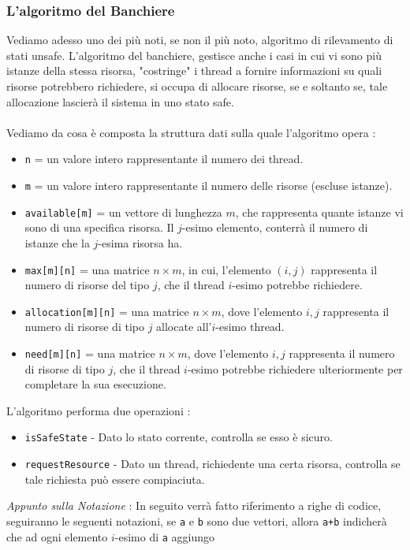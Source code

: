 \documentclass[12pt, letterpaper]{article}
\newcommand{\code}[1]{\colorbox{light-gray}{\texttt{#1}}}
\newcommand{\acc}{\\\hphantom{}\\}
\begin{document}
\subsubsection{L'algoritmo del Banchiere}\label{banchiere}
Vediamo adesso uno dei più noti, se non il più noto, algoritmo di rilevamento di stati unsafe. L'algoritmo del banchiere, 
gestisce anche i casi in cui vi sono più istanze della stessa risorsa, "costringe" i thread a fornire informazioni 
su quali risorse potrebbero richiedere, si occupa di allocare risorse, se e soltanto se, tale allocazione 
lascierà il sistema in uno stato safe.\acc 
Vediamo da cosa è composta la struttura dati sulla quale l'algoritmo opera : \begin{itemize}
    \item \code{n} = un valore intero rappresentante il numero dei thread.
    \item \code{m} = un valore intero rappresentante il numero delle risorse (escluse istanze).
    \item \code{available[m]} = un vettore di lunghezza \(m\), che rappresenta quante istanze vi sono di una specifica 
    risorsa. Il \(j\)-esimo elemento, conterrà il numero di istanze che la \(j\)-esima risorsa ha. 
    \item \code{max[m][n]} = una matrice \(n\times m\), in cui, l'elemento \((i,j)\) rappresenta 
    il numero di risorse del tipo \(j\), che il thread \(i\)-esimo potrebbe richiedere. 
    \item \code{allocation[m][n]} = una matrice \(n\times m\), dove l'elemento \(i,j\) rappresenta il numero di 
    risorse di tipo \(j\) allocate all'\(i\)-esimo thread.
    \item \code{need[m][n]} = una matrice \(n\times m\), dove l'elemento \(i,j\) rappresenta il numero di 
    risorse di tipo \(j\), che il thread \(i\)-esimo potrebbe richiedere ulteriormente per completare la sua 
    esecuzione.
\end{itemize}
L'algoritmo performa due operazioni : \begin{itemize}
    \item \code{isSafeState} - Dato lo stato corrente, controlla se esso è sicuro. 
    \item \code{requestResource} - Dato un thread, richiedente una certa risorsa, controlla se tale richiesta 
    può essere compiaciuta.
\end{itemize}
\textit{Appunto sulla Notazione }: In seguito verrà fatto riferimento a righe di codice, seguiranno le seguenti notazioni, se 
\code{a} e \code{b} sono due vettori, allora \code{a+b} indicherà che ad ogni elemento \(i\)-esimo di \code{a} aggiungo 
\end{document}
